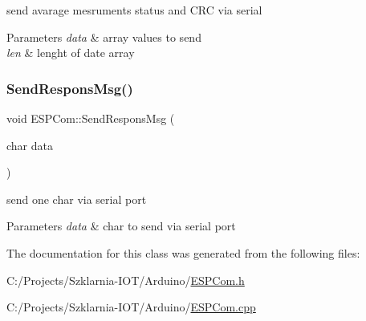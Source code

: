 send avarage mesruments status and C\+RC via serial 


\begin{DoxyParams}{Parameters}
{\em data} & array values to send \\
\hline
{\em len} & lenght of date array \\
\hline
\end{DoxyParams}
\mbox{\label{class_e_s_p_com_adb3506c54acc4b5101fccf1204b3796c}} 
\subsubsection{\texorpdfstring{Send\+Respons\+Msg()}{SendResponsMsg()}}
{\footnotesize\ttfamily void E\+S\+P\+Com\+::\+Send\+Respons\+Msg (\begin{DoxyParamCaption}\item[{char}]{data }\end{DoxyParamCaption})}



send one char via serial port 


\begin{DoxyParams}{Parameters}
{\em data} & char to send via serial port \\
\hline
\end{DoxyParams}


The documentation for this class was generated from the following files\+:\begin{DoxyCompactItemize}
\item 
C\+:/\+Projects/\+Szklarnia-\/\+I\+O\+T/\+Arduino/\hyperlink{_e_s_p_com_8h}{E\+S\+P\+Com.\+h}\item 
C\+:/\+Projects/\+Szklarnia-\/\+I\+O\+T/\+Arduino/\hyperlink{_e_s_p_com_8cpp}{E\+S\+P\+Com.\+cpp}\end{DoxyCompactItemize}
